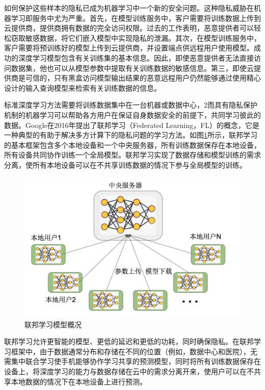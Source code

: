 如何保护这些样本的隐私已成为机器学习中一个新的安全问题。这种隐私威胁在机器学习即服务中尤为严重。首先，在模型训练服务中，客户需要将训练数据上传到云提供商，提供商拥有数据的完全访问权限。过去的工作表明，恶意提供者可以轻松窃取敏感数据，将它们嵌入模型中实现隐私的泄漏。其次，在模型训练服务中，客户需要将预训练好的模型上传到云提供商，并设置端点供远程用户使用模型。成功的深度学习模型包含有关训练集的基本信息。因此，即使恶意提供者无法直接访问数据集，他也可以从模型参数中提取有关训练数据的敏感信息。第三，即使云提供商是可信的，只有黑盒访问模型输出结果的恶意远程用户仍然能够通过使用精心设计的输入查询模型来检索有关训练数据的信息。

标准深度学习方法需要将训练数据集中在一台机器或数据中心，2而具有隐私保护机制的机器学习可以帮助各方用户在保证自身数据安全的前提下，共同学习彼此的数据。Google在2016年提出了联邦学习（Federated Learning，FL）的概念，它是一种典型的有助于解决多方计算下的隐私问题的学习方法。如图\ref{fig:联邦学习模型概况}所示，联邦学习的基本框架包含多个本地设备和一个中央服务器，所有训练数据保存在本地设备，所有设备共同协作训练一个全局模型。联邦学习实现了数据存储和模型训练的需求分离，使所有本地设备可以在不共享训练数据的情况下参与全局模型的训练。

\begin{figure}[!hbt]
\centering
	\includegraphics[scale=0.5]{fig2/C1/联邦学习}%
	\caption{联邦学习模型概况}
	\label{fig:联邦学习模型概况}	
\end{figure}

联邦学习允许更智能的模型、更低的延迟和更低的功耗，同时确保隐私。在联邦学习框架中，由于数据通常分布和存储在不同的位置（例如，数据中心和医院），无需集中联合学习使手机能够协作学习共享的预测模型，同时将所有训练数据保存在设备上，将深度学习的能力与数据存储在云中的需求分离开来，使用户可以在不共享本地数据的情况下在本地设备上进行预测。

